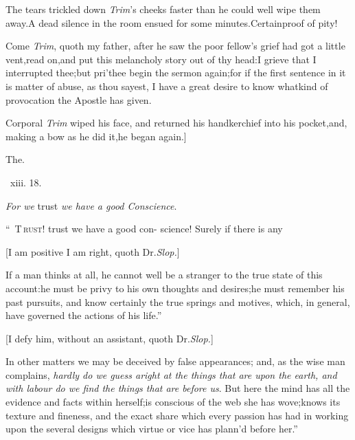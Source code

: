 \documentclass{article}
\begin{document}
\tsh The tears trickled down \textit{Trim}’s cheeks faster
than he could well wipe them away.\tsk A dead silence in the room
ensued for some minutes.\tsh Certain\break proof of pity!

Come \textit{Trim}, quoth my father, after he saw the poor
fellow’s grief had got a little vent,\tsk read
on,\tsk and put this melancholy story out of thy head:\tsk I
grieve that I interrupted thee;\tsk but pri’thee begin the sermon
again;\tsk for if the first sentence in it is matter of abuse, as
thou sayest, I have a great desire to know what\break kind of provocation
the Apostle has given.

Corporal \textit{Trim} wiped his face, and returned his
handkerchief into his pocket,\pb and, making a bow as he did
it,\tsk he began again.]

\bigskip
\centerline{The\quad {}.}
\bigskip
\centerline{\, xiii. 18.}
\tsh \textit{For we} trust \textit{we have a good
Conscience}.\tsh

\lettrine{\lower-12pt\hbox{\normalsize “
}T}{\,rust!} trust we have a good con-\break
science! Surely if there is any\break
{}

[I am positive I am right, quoth Dr.\@ \textit{Slop.}]

\newpage
\begin{story}{If a man thinks at all, he cannot}
well be a stranger to the true state of 
this account:\tsk he must be privy to
his own thoughts and desires;\tsh he
must remember his past pursuits, and
know certainly the true springs and
motives, which, in general, have governed the actions of his life.”
\end{story}
\vspace\parskip

[I defy him, without an assistant, quoth Dr.\@ \textit{Slop.}]

\begin{story}{In other matters we may be deceived}
by false appearances; and, as the
    wise man complains,
    \textit{hardly do we guess\break
aright at the things that are upon the earth, and with labour do we
find the things that are before us}. But here the mind has all
the evidence and facts with\-in
    herself;\tsk is conscious of
the web she has wove;\tsk knows its
    texture and\pb
fineness,
and the exact share which every passion has had in working upon the
several designs which virtue or vice
    has plann’d before
her.”
\end{story}
\vspace\parskip
\end{document}
